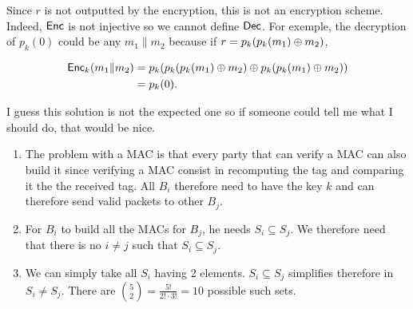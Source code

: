 \begin{solution}
  Since $r$ is not outputted by the encryption, this is not an encryption scheme.
  Indeed, $\operatorname{\mathsf{Enc}}$ is not injective so we cannot define $\operatorname{\mathsf{Dec}}$.
  For exemple, the decryption of $p_k(0)$ could be any $m_1\|m_2$ because
  if $r = p_k(p_k(m_1) \oplus m_2)$,

  \begin{align*}
    \operatorname{\mathsf{Enc}}_k(m_1\|m_2) & = p_k(p_k(p_k(m_1) \oplus m_2) \oplus p_k(p_k(m_1) \oplus m_2))\\
                     & = p_k(0).
  \end{align*}

  I guess this solution is not the expected one so if someone could tell me what I should do, that would be nice.
\end{solution}

\begin{solution}
  \begin{enumerate}
    \item
      The problem with a MAC is that every party that can verify a MAC can also build it since verifying a MAC consist
      in recomputing the tag and comparing it the the received tag.
      All $B_i$ therefore need to have the key $k$ and can therefore send valid packets to other $B_j$.
    \item
      For $B_i$ to build all the MACs for $B_j$, he needs $S_i \subseteq S_j$.
      We therefore need that there is no $i \neq j$ such that $S_i \subseteq S_j$.
    \item We can simply take all $S_i$ having 2 elements.
      $S_i \subseteq S_j$ simplifies therefore in $S_i \neq S_j$.
      There are ${5 \choose 2} = \frac{5!}{2! \cdot 3!} = 10$ possible such sets.
  \end{enumerate}
\end{solution}
